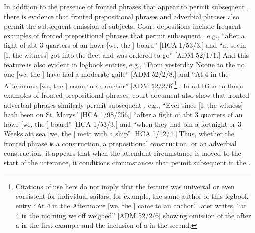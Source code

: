 In addition to the presence of fronted  phrases that appear to permit subsequent , there is evidence that fronted prepositional phrases and adverbial phrases also permit the subsequent omission of  subjects. Court depositions include frequent examples of fronted prepositional phrases that permit subsequent , e.g., “after a fight of abt 3 quarters of an howr [we, the ] board” [HCA 1/53/3,] and “at sevin [I, the witness] got into the fleet and was ordered to go” [ADM 52/1/1.] And this feature is also evident in logbook entries, e.g., “From yesterday Noone to the no one [we, the ] have had a moderate gaile” [ADM 52/2/8,] and “At 4 in the Afternoone [we, the ] came to an anchor” [ADM 52/2/6]\footnote{Citations of use here do not imply that the feature was universal or even consistent for individual sailors, for example, the same author of this logbook entry “At 4 in the Afternoone [we, the ] came to an anchor” later writes, “at 4 in the morning we off weighed” [ADM 52/2/6] showing omission of the  after a  in the first example and the inclusion of a  in the second.} .  In addition to these examples of fronted prepositional phrases, court document also show that fronted adverbial phrases similarly permit subsequent , e.g., “Ever since [I, the witness] hath been on St. Marys” [HCA 1/98/256,] “after a fight of abt 3 quarters of an howr [we, the ] board” [HCA 1/53/3,] and “when they had bin a fortnight or 3 Weeks att sea [we, the ] mett with a ship” [HCA 1/12/4.] Thus, whether the fronted phrase is a  construction, a prepositional construction, or an adverbial construction, it appears that when the attendant circumstance is moved to the start of the utterance, it conditions circumstances that permit subsequent  in the . 

